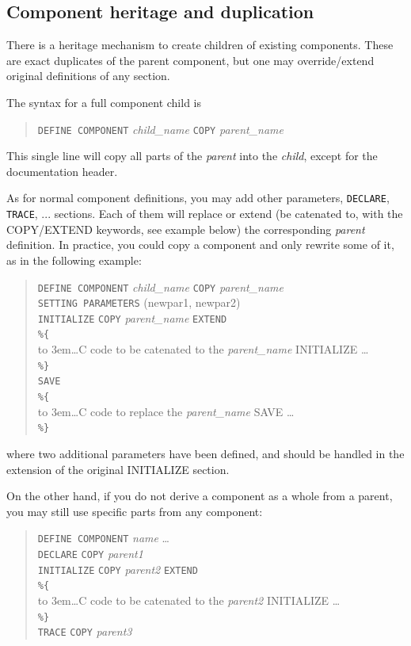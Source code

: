\subsection{Component heritage and duplication}

There is a heritage mechanism to create children of existing components. These are exact duplicates of the parent component, but one may override/extend original definitions of any section.

The syntax for a full component child is
\begin{quote}
  \texttt{DEFINE COMPONENT} \textit{child\_name} \texttt{COPY} \textit{parent\_name}
\end{quote}
This single line will copy all parts of the \textit{parent} into the \textit{child}, except for the documentation header.

As for normal component definitions, you may add other parameters, \texttt{DECLARE}, \texttt{TRACE}, ... sections. Each of them will replace or extend (be catenated to, with the COPY/EXTEND keywords, see example below) the corresponding \textit{parent} definition. In practice, you could copy a component and only rewrite some of it, as in the following example:
\begin{quote}
  \texttt{DEFINE COMPONENT} \textit{child\_name} \texttt{COPY} \textit{parent\_name} \\

  \texttt{SETTING PARAMETERS} (newpar1, newpar2) \\
  \texttt{INITIALIZE} \texttt{COPY} \textit{parent\_name} \texttt{EXTEND} \\
  \verb|%{|  \\
  \hbox to 3em{}\ldots C code to be catenated to the \textit{parent\_name} INITIALIZE \ldots  \\
  \verb|%}| \\
  \texttt{SAVE} \\
  \verb|%{|  \\
  \hbox to 3em{}\ldots C code to replace the \textit{parent\_name} SAVE \ldots  \\
  \verb|%}| \\
\end{quote}
where two additional parameters have been defined, and should be handled in the extension of the original INITIALIZE section.

On the other hand, if you do not derive a component as a whole from a parent, you may still use specific parts from any component:
\begin{quote}
  \texttt{DEFINE COMPONENT} \textit{name} \ldots \\
  \texttt{DECLARE} \texttt{COPY} \textit{parent1} \\
  \texttt{INITIALIZE} \texttt{COPY} \textit{parent2} \texttt{EXTEND} \\
  \verb|%{|  \\
  \hbox to 3em{}\ldots C code to be catenated to the \textit{parent2} INITIALIZE \ldots  \\
  \verb|%}| \\
  \texttt{TRACE} \texttt{COPY} \textit{parent3}
\end{quote}

